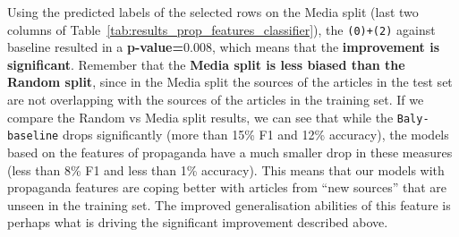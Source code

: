Using the predicted labels of the selected rows on the Media split (last two columns of Table~\ref{tab:results_prop_features_classifier}), the \texttt{(0)+(2)} against baseline resulted in a \textbf{p-value=$0.008$}, which means that the \textbf{improvement is significant}.
Remember that the \textbf{Media split is less biased than the Random split}, since in the Media split the sources of the articles in the test set are not overlapping with the sources of the articles in the training set. If we compare the Random vs Media split results, we can see that while the \texttt{Baly-baseline} drops significantly (more than 15\% F1 and 12\% accuracy), the models based on the features of propaganda have a much smaller drop in these measures (less than 8\% F1 and less than 1\% accuracy).
This means that our models with propaganda features are coping better with articles from ``new sources'' that are unseen in the training set. 
The improved generalisation abilities of this feature is perhaps what is driving the significant improvement described above. %

